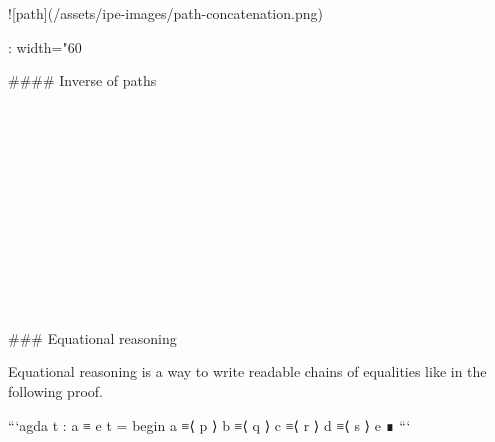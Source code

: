 ![path](/assets/ipe-images/path-concatenation.png){: width="60%

#### Inverse of paths

\begin{code}%
\>[0]\<%
\\
\>[0][@{}l@{\AgdaIndent{0}}]%
\>[2]\AgdaSymbol{:}\AgdaSpace{}%
\AgdaSpace{}%
\AgdaSymbol{\{}\AgdaSymbol{\}}\AgdaSpace{}%
\AgdaSymbol{\{}\AgdaSpace{}%
\AgdaSymbol{:}\AgdaSpace{}%
\AgdaSpace{}%
\AgdaSymbol{\}}\AgdaSpace{}%
\AgdaSymbol{\{}\AgdaSpace{}%
\AgdaSpace{}%
\AgdaSymbol{:}\AgdaSpace{}%
\AgdaSymbol{\}}\<%
\\
%
\>[2]\AgdaSpace{}%
\AgdaSpace{}%
\AgdaOperator{\AgdaDatatype{==}}\AgdaSpace{}%
\<%
\\
%
\>[2]\AgdaComment{--------}\<%
\\
%
\>[2]\AgdaSpace{}%
\AgdaSpace{}%
\AgdaOperator{\AgdaDatatype{==}}\AgdaSpace{}%
\<%
\\
%
\\[\AgdaEmptyExtraSkip]%
\>[0]\AgdaSpace{}%
\AgdaSpace{}%
\AgdaSymbol{=}\AgdaSpace{}%
\<%
\end{code}

\begin{code}%
\>[0]\<%
\\
\>[0]\AgdaSpace{}%
\AgdaSymbol{=}\AgdaSpace{}%
\<%
\\
\>[0]\AgdaOperator{\AgdaFunction{!\AgdaUnderscore{}}}%
\>[4]\AgdaSymbol{=}\AgdaSpace{}%
\<%
\\
%
\\[\AgdaEmptyExtraSkip]%
\>[0]\AgdaSpace{}%
\AgdaSpace{}%
\AgdaSpace{}%
\AgdaOperator{\AgdaFunction{!\AgdaUnderscore{}}}\<%
\end{code}

### Equational reasoning

Equational reasoning is a way to write readable chains of equalities like
in the following proof.

{%
```agda
  t : a ≡ e
  t =
    begin
      a ≡⟨ p ⟩
      b ≡⟨ q ⟩
      c ≡⟨ r ⟩
      d ≡⟨ s ⟩
      e
    ∎
```
{%

}}}
